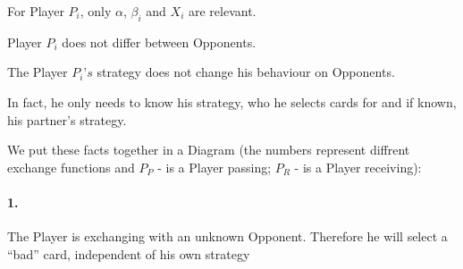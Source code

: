 \begin{axioms}[(F1)]
\item For Player $P_i$, only $\alpha$, $\beta_i$ and $X_i$ are relevant.
\item Player $P_i$ does not differ between Opponents. 
\item The Player $P_i’s$ strategy does not change his behaviour on Opponents. 
\item In fact, he only needs to know his strategy, who he selects cards for and if known, his partner’s strategy. 
\end{axioms}

We put these facts together in a Diagram (the numbers represent diffrent exchange functions and $P_P$ - is a Player passing; $P_R$ - is a Player receiving):

\begin{table}[h]
\caption{Table 1.1} \bigskip
\label{tab:my-table}
\end{table}
\paragraph{1.}
The Player is exchanging with an unknown Opponent. Therefore he will select a “bad” card, independent of his own strategy
